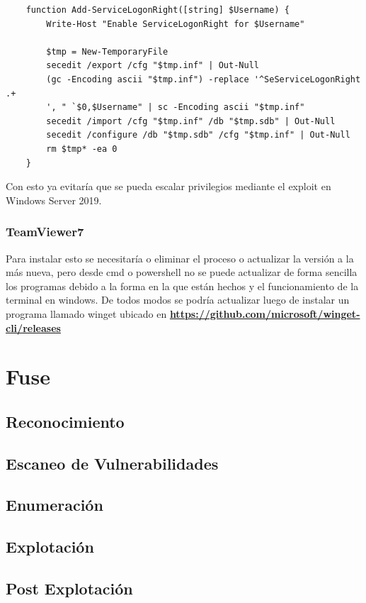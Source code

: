 \documentclass{article}
\begin{document}
\begin{lstlisting}
	function Add-ServiceLogonRight([string] $Username) {
		Write-Host "Enable ServiceLogonRight for $Username"
	
		$tmp = New-TemporaryFile
		secedit /export /cfg "$tmp.inf" | Out-Null
		(gc -Encoding ascii "$tmp.inf") -replace '^SeServiceLogonRight .+
		', " `$0,$Username" | sc -Encoding ascii "$tmp.inf"
		secedit /import /cfg "$tmp.inf" /db "$tmp.sdb" | Out-Null
		secedit /configure /db "$tmp.sdb" /cfg "$tmp.inf" | Out-Null
		rm $tmp* -ea 0
	}
\end{lstlisting}	

Con esto ya evitaría que se pueda escalar privilegios mediante el exploit en Windows Server 2019.

\subsubsection{TeamViewer7}

Para instalar esto se necesitaría o eliminar el proceso o actualizar la versión a la más nueva, pero desde cmd o powershell no se puede actualizar de forma sencilla los programas debido a la forma en la que están hechos y el funcionamiento de la terminal en windows.
De todos modos se podría actualizar luego de instalar un programa llamado winget ubicado en \textbf{\href{https://github.com/microsoft/winget-cli/releases}{https://github.com/microsoft/winget-cli/releases}}


\clearpage
\section{Fuse}
\subsection{Reconocimiento}
\subsection{Escaneo de Vulnerabilidades}
\subsection{Enumeración}
\subsection{Explotación}
\subsection{Post Explotación}
\end{document}
